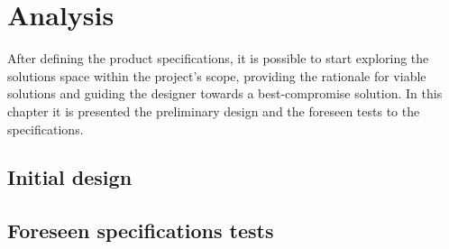 \chapter{Analysis}%
\label{ch:analysis}
After defining the product specifications, it is possible to start exploring the
solutions space within the project's scope, providing the rationale for viable
solutions and guiding the designer towards a best-compromise solution. In this
chapter it is presented the preliminary design and the foreseen tests to
the specifications. 
%
%
%
%
\section{Initial design}%
\label{sec:initial-design}

%
\section{Foreseen specifications tests}%
\label{sec:planning}

%
